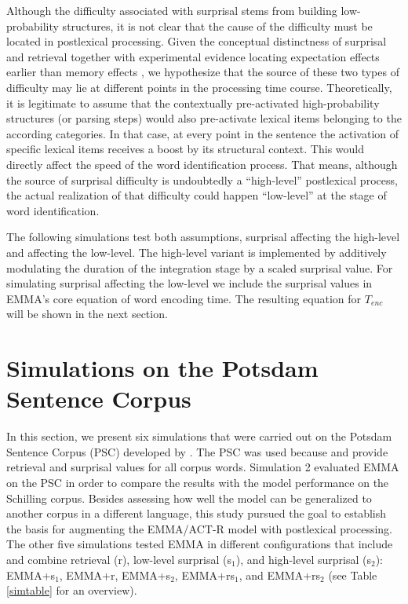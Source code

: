 Although the difficulty associated with surprisal stems from building low-probability structures, it is not clear that the cause of the difficulty must be located in postlexical processing.
Given the conceptual distinctness of surprisal and retrieval together with experimental evidence locating expectation effects earlier than memory effects \citep{Staub2010a,Vasishth2011}, we hypothesize that the source of these two types of difficulty may lie at different points in the processing time course.
Theoretically, it is legitimate to assume that the contextually pre-activated high-probability structures (or parsing steps) would also pre-activate lexical items belonging to the according categories. In that case, at every point in the sentence the activation of specific lexical items receives a boost by its structural context. This would directly affect the speed of the word identification process.
That means, although the source of surprisal difficulty is undoubtedly a ``high-level'' postlexical process, the actual realization of that difficulty could happen ``low-level'' at the stage of word identification.

The following simulations test both assumptions, surprisal affecting the  high-level and affecting the  low-level.  The high-level variant is implemented by additively modulating the duration of the integration stage by a scaled surprisal value. For simulating surprisal affecting the low-level we include the surprisal values in EMMA's core equation of word encoding time. The resulting equation for $T_{enc}$ will be shown in the next section.

\section{Simulations on the Potsdam Sentence Corpus} \label{sec:topics:psc}

In this section, we present six simulations that were carried out on the Potsdam Sentence Corpus (PSC) developed by \cite{Kliegl2004}. The PSC was used because \cite{jemrsurprisal} and \cite{BostonHaleVasishth2011} provide retrieval and surprisal values for all corpus words.  Simulation 2 evaluated EMMA on the PSC in order to compare the results with the model performance on the Schilling corpus.  Besides assessing how well the model can be generalized to another corpus in a different language, this study pursued the goal to establish the basis for augmenting the EMMA/ACT-R model with postlexical processing. 
The other five simulations tested EMMA in different configurations that include and combine retrieval (r), low-level surprisal (s$_1$), and high-level surprisal (s$_2$): EMMA+s$_1$, EMMA+r, EMMA+s$_2$, EMMA+rs$_1$, and EMMA+rs$_2$ (see Table \ref{simtable} for an overview).

